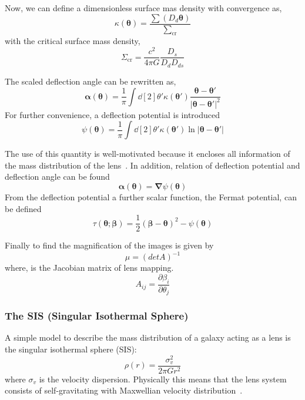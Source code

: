 Now, we can define a dimensionless surface mas density with convergence as,
\begin{equation}
\kappa(\pmb\theta)=\frac{\sum(D_{d} \pmb \theta)}{\sum_\text{cr}}
\label{Equ:KTheta}
\end{equation}
with the critical surface mass density,
 \begin{equation}
 \Sigma_\text{cr}=\frac{c^2}{4\pi G}\frac{D_{s}}{D_{d}D_{ds}}
 \label{SumCr}
 \end{equation}
 
The scaled deflection angle can be rewritten as,
\begin{equation}
   \pmb\alpha(\pmb\theta)=\frac{1}{\pi}\int \dd[2]{\theta'} \kappa(\pmb{\theta}')\frac{\pmb\theta-\pmb\theta'}{| \pmb\theta -\pmb\theta'| ^2}
\label{ScaledDA}
\end{equation} 
For further convenience, a deflection potential is introduced
\begin{equation}
   \psi(\pmb\theta)=\frac{1}{\pi}\int \dd[2]{\theta'} \kappa(\pmb\theta') \ln | \pmb\theta- \pmb\theta'| 
\label{psiTheta}
\end{equation}

The use of this quantity is well-motivated because it encloses all information of the mass distribution of the lens~\cite{manual}. In addition, relation of deflection potential and deflection angle can be found
\begin{equation}
\pmb\alpha(\pmb\theta)=\pmb\nabla\psi(\pmb\theta)
\label{Equ:AlphaTheta}
\end{equation}
From the deflection potential a further scalar function, the Fermat potential, can be defined
\begin{equation}
\tau(\pmb\theta; \pmb\beta)=\frac{1}{2}(\pmb\beta -\pmb\theta)^2 -\psi(\pmb\theta)
\label{Equ:Format}
\end{equation}

Finally to find the magnification of the images is given by
\begin{equation}
\mu =(det A)^{-1}
\end{equation}
where,  is the Jacobian matrix of lens mapping.
\begin{equation}
A_{ij}=\frac{\partial\beta_{i}}{\partial \theta_{j}}
\end{equation}

\subsubsection{The SIS (Singular Isothermal Sphere)}
A simple model to describe the mass distribution of a galaxy acting as a lens is the singular isothermal sphere (SIS):
\begin{equation}
\rho(r)=\frac{\sigma_{v}^{2}}{2\pi G r^2}
\label{equ:SIS}
\end{equation}
where $ \sigma_{v} $ is the velocity dispersion. Physically this means that the lens system consists of self-gravitating with Maxwellian velocity distribution~\cite{Schneider}.

